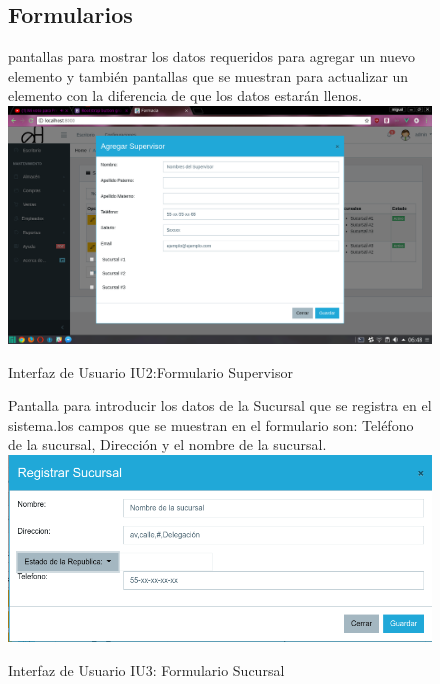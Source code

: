 \begin{figure}[htbp!]
	\begin{center}
	\subsection{Formularios}
	pantallas para mostrar los datos requeridos para agregar un nuevo elemento
y también pantallas que se muestran para actualizar un elemento 
con la diferencia de que los datos estarán llenos.
		\includegraphics[width=\textwidth]{Pantallas/FormularioSupervisor}
		\caption{Interfaz de Usuario IU2:Formulario Supervisor}
	\end{center}
\end{figure}




\begin{figure}[htbp!]
	\begin{center}
	Pantalla para introducir los datos de la Sucursal que se registra en el sistema.los campos que se muestran en el formulario son: Teléfono de la sucursal, Dirección y el nombre de la sucursal.
\includegraphics[width=\textwidth]{Pantallas/FormularioSucursal}
		\caption{Interfaz de Usuario IU3: Formulario Sucursal}
	\end{center}
\end{figure}


